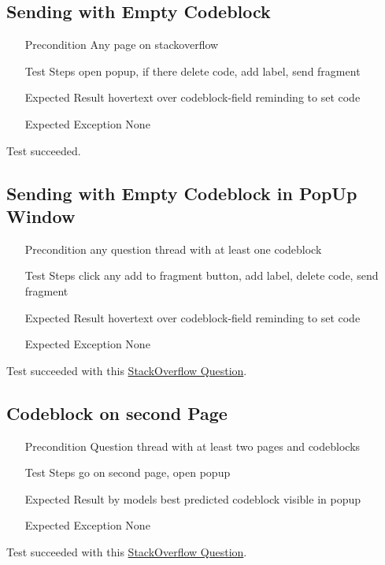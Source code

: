 \documentclass{report}
\begin{document}
\subsection*{Sending with Empty Codeblock}
\begin{itemize}
	\item[Precondition] Any page on stackoverflow
	\item[Test Steps] open popup, if there delete code, add label, send fragment
	\item[Expected Result] hovertext over codeblock-field reminding to set code
	\item[Expected Exception] None
\end{itemize}
Test succeeded.

\subsection*{Sending with Empty Codeblock in PopUp Window}
\begin{itemize}
	\item[Precondition] any question thread with at least one codeblock
	\item[Test Steps] click any add to fragment button, add label, delete code, send fragment
	\item[Expected Result] hovertext over codeblock-field reminding to set code
	\item[Expected Exception] None
\end{itemize}
Test succeeded with this \href{https://stackoverflow.com/questions/442404/retrieve-the-position-x-y-of-an-html-element}{StackOverflow Question}. 

\subsection*{Codeblock on second Page}
\begin{itemize}
	\item[Precondition] Question thread with at least two pages and codeblocks
	\item[Test Steps] go on second page, open popup
	\item[Expected Result] by models best predicted codeblock visible in popup
	\item[Expected Exception] None
\end{itemize}
Test succeeded with this \href{https://stackoverflow.com/questions/221294/how-do-you-get-a-timestamp-in-javascript?page=2}{StackOverflow Question}. 
\end{document}
